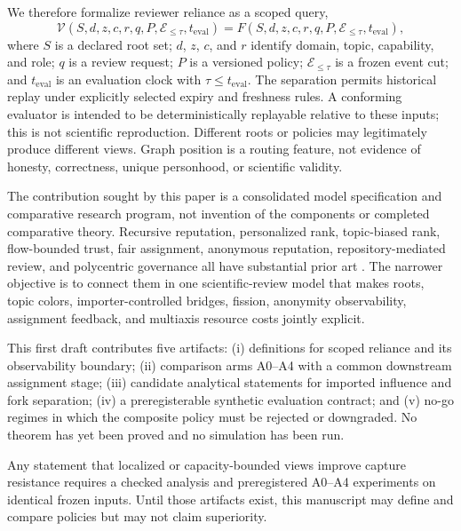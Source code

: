 \documentclass[11pt]{article}
\newcommand{\view}{\mathcal{V}}
\newcommand{\events}{\mathcal{E}}
\begin{document}
We therefore formalize reviewer reliance as a scoped query,
\begin{equation}
 \view(S,d,z,c,r,q,P,\events_{\leq\tau},t_{\mathrm{eval}})
   = F(S,d,z,c,r,q,P,\events_{\leq\tau},t_{\mathrm{eval}}),
 \label{eq:view}
\end{equation}
where $S$ is a declared root set; $d$, $z$, $c$, and $r$ identify domain, topic, capability, and role; $q$ is a review request; $P$ is a versioned policy; $\events_{\leq\tau}$ is a frozen event cut; and $t_{\mathrm{eval}}$ is an evaluation clock with $\tau\leq t_{\mathrm{eval}}$.  The separation permits historical replay under explicitly selected expiry and freshness rules. A conforming evaluator is intended to be deterministically replayable relative to these inputs; this is not scientific reproduction. Different roots or policies may legitimately produce different views.  Graph position is a routing feature, not evidence of honesty, correctness, unique personhood, or scientific validity.

The contribution sought by this paper is a consolidated model specification and comparative research program, not invention of the components or completed comparative theory. Recursive reputation, personalized rank, topic-biased rank, flow-bounded trust, fair assignment, anonymous reputation, repository-mediated review, and polycentric governance all have substantial prior art \citep{levien1998attack,stelmakh2021peerreview4all,zhai2016anonrep,rodriguez2006convergence,ostrom2010polycentric}.  The narrower objective is to connect them in one scientific-review model that makes roots, topic colors, importer-controlled bridges, fission, anonymity observability, assignment feedback, and multiaxis resource costs jointly explicit.

This first draft contributes five artifacts: (i) definitions for scoped reliance and its observability boundary; (ii) comparison arms A0--A4 with a common downstream assignment stage; (iii) candidate analytical statements for imported influence and fork separation; (iv) a preregisterable synthetic evaluation contract; and (v) no-go regimes in which the composite policy must be rejected or downgraded.  No theorem has yet been proved and no simulation has been run.

\begin{evidencegate}
Any statement that localized or capacity-bounded views improve capture resistance requires a checked analysis and preregistered A0--A4 experiments on identical frozen inputs.  Until those artifacts exist, this manuscript may define and compare policies but may not claim superiority.
\end{evidencegate}
\end{document}
